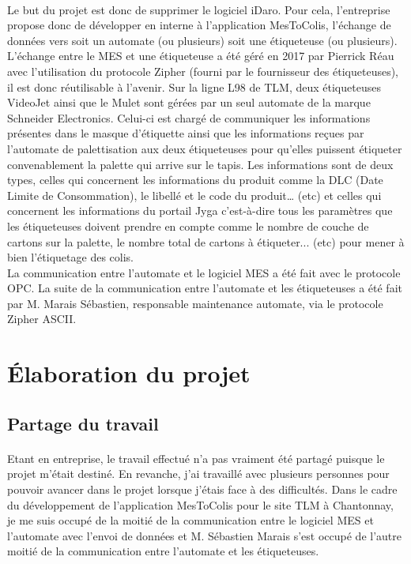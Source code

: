 \documentclass[a4paper,12pt]{extarticle}
\begin{document}
		\paragraph{}

	Le but du projet est donc de supprimer le logiciel iDaro. Pour cela, l’entreprise propose donc de développer en interne à l’application MesToColis, l’échange de données vers soit un automate (ou plusieurs) soit une étiqueteuse (ou plusieurs). L’échange entre le MES et une étiqueteuse a été géré en 2017 par Pierrick Réau avec l’utilisation du protocole Zipher (fourni par le fournisseur des étiqueteuses), il est donc réutilisable à l’avenir. Sur la ligne L98 de TLM, deux étiqueteuses VideoJet ainsi que le Mulet sont gérées par un seul automate de la marque Schneider Electronics. Celui-ci est chargé de communiquer les informations présentes dans le masque d’étiquette ainsi que les informations reçues par l’automate de palettisation aux deux étiqueteuses pour qu’elles puissent étiqueter convenablement la palette qui arrive sur le tapis. Les informations sont de deux types, celles qui concernent les informations du produit comme la DLC (Date Limite de Consommation), le libellé et le code du produit… (etc) et celles qui concernent les informations du portail Jyga c’est-à-dire tous les paramètres que les étiqueteuses doivent prendre en compte comme le nombre de couche de cartons sur la palette, le nombre total de cartons à étiqueter... (etc) pour mener à bien l’étiquetage des colis.\\
La communication entre l’automate et le logiciel MES a été fait avec le protocole OPC. La suite de la communication entre l’automate et les étiqueteuses a été fait par M. Marais Sébastien, responsable maintenance automate, via le protocole Zipher ASCII.

	\clearpage
	
	\section{Élaboration du projet}
	
	\subsection{Partage du travail}
		\paragraph{}

	Etant en entreprise, le travail effectué n’a pas vraiment été partagé puisque le projet m’était destiné. En revanche, j’ai travaillé avec plusieurs personnes pour pouvoir avancer dans le projet lorsque j’étais face à des difficultés. Dans le cadre du développement de l’application MesToColis pour le site TLM à Chantonnay, je me suis occupé de la moitié de la communication entre le logiciel MES et l’automate avec l’envoi de données et M. Sébastien Marais s’est occupé de l’autre moitié de la communication entre l’automate et les étiqueteuses.\\ \\
	
\end{document}
